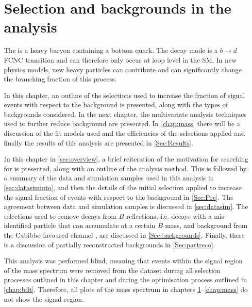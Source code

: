 \chapter{Selection and backgrounds in the \boldmath{\Lbpi} analysis}
\label{chap:sel}
The \Lb is a heavy baryon containing a bottom quark. The decay mode \Lbpi is a $b\to d$ \Gls{FCNC} transition and can therefore only occur at loop level in the SM. In new physics models, new heavy particles can contribute and can significantly change the branching fraction of this process.

In this chapter, an outline of the selections used to increase the fraction of signal events with respect to the background is presented, along with the types of backgrounds considered. In the next chapter, the multivariate analysis techniques used to further reduce background are presented. In \autoref{chap:mass} there will be a discussion of the fit models used and the efficiencies of the selections applied and finally the results of this analysis are presented in \autoref{Sec:Results}.

In this chapter in \autoref{sec:overview}, a brief reiteration of the motivation for searching for \Lbpi is presented, along with an outline of the analysis method. This is followed by a summary of the data and simulation samples used in this analysis in \autoref{sec:datasiminto}, and then the details of the initial selection applied to increase the signal fraction of events with respect to the background in \autoref{Sec:Pre}. The agreement between data and simulation samples is discussed in \autoref{sec:datasim}. The selections used to remove decays from $B$ reflections, i.e. decays with a mis-identified particle that can accumulate at a certain $B$ mass, and background from the Cabibbo-favoured channel \LbK, are discussed in \autoref{Sec:backgrounds}. Finally, there is a discussion of partially reconstructed backgrounds in \autoref{Sec:partreco}. %

This analysis was performed blind, meaning that events within the signal region of the \Lbpi mass spectrum were removed from the dataset during all selection processes outlined in this chapter and during the optimisation process outlined in \autoref{chap:bdt}. Therefore, all plots of the \Lbpi mass spectrum in chapters \ref{chap:sel}--\ref{chap:mass} do not show the signal region.

